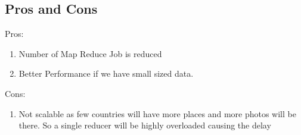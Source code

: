 \subsection{Pros and Cons}

Pros:
\begin{enumerate}
	\item Number of Map Reduce Job is reduced
	\item Better Performance if we have small sized data.
\end{enumerate}

Cons:
\begin{enumerate}
	\item Not scalable as few countries will have more places and more photos will be there. So a single reducer will be highly overloaded causing the delay
\end{enumerate}